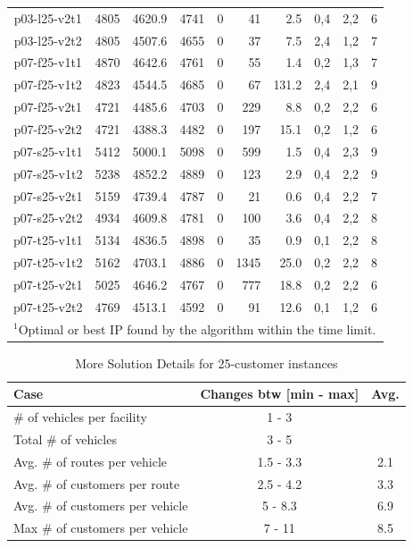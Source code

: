 \begin{table}[!htbp]
\begin {tabular}[!h]{|c|c|c|c|c|r|r|c|c|c|}
p03-l25-v2t1 &  4805 &  4620.9 & 4741   & 0 & 41    & 2.5   & 0,4   & 2,2   & 6 \\
p03-l25-v2t2 &  4805 &  4507.6 & 4655   & 0 & 37    & 7.5   & 2,4   & 1,2   & 7 \\\hline
p07-f25-v1t1 &  4870 &  4642.6 & 4761   & 0 & 55    & 1.4   & 0,2   & 1,3   & 7 \\
p07-f25-v1t2 &  4823 &  4544.5 & 4685   & 0 & 67    & 131.2 & 2,4   & 2,1   & 9 \\
p07-f25-v2t1 &  4721 &  4485.6 & 4703   & 0 & 229   & 8.8   & 0,2   & 2,2   & 6 \\
p07-f25-v2t2 &  4721 &  4388.3 & 4482   & 0 & 197   & 15.1  & 0,2   & 1,2   & 6 \\\hline
p07-s25-v1t1 &  5412 &  5000.1 & 5098   & 0 & 599   & 1.5   & 0,4   & 2,3   & 9 \\
p07-s25-v1t2 &  5238 &  4852.2 & 4889   & 0 & 123   & 2.9   & 0,4   & 2,2   & 9 \\
p07-s25-v2t1 &  5159 &  4739.4 & 4787   & 0 & 21    & 0.6   & 0,4   & 2,2   & 7 \\
p07-s25-v2t2 &  4934 &  4609.8 & 4781   & 0 & 100   & 3.6   & 0,4   & 2,2   & 8 \\\hline
p07-t25-v1t1 &  5134 &  4836.5 & 4898   & 0 & 35    & 0.9   & 0,1   & 2,2   & 8 \\
p07-t25-v1t2 &  5162 &  4703.1 & 4886   & 0 & 1345  & 25.0  & 0,2   & 2,2   & 8 \\
p07-t25-v2t1 &  5025 &  4646.2 & 4767   & 0 & 777   & 18.8  & 0,2   & 2,2   & 6 \\
p07-t25-v2t2 &  4769 &  4513.1 & 4592   & 0 & 91    & 12.6  & 0,1   & 1,2   & 6 \\\hline
\multicolumn{10}{l}{$^1$Optimal or best IP found by the algorithm within the time limit.}\\
\end{tabular}
\end{table}

\begin{table}[h!tbp]
\centering
\caption{More Solution Details for 25-customer instances}\label{SolDet}
\begin {tabular}[!h]{|l|c|c|} \hline
Case                          & Changes btw [min - max] & Avg.  \\\hline
\# of vehicles per facility      &  1 - 3 &  \mbox{}  \\
Total \# of vehicles             &  3 - 5  &  \mbox{}  \\
Avg. \# of routes per vehicle    &  1.5 - 3.3 & 2.1  \\
Avg. \# of customers per route   &  2.5 - 4.2 & 3.3  \\
Avg. \# of customers per vehicle &  5 - 8.3   & 6.9  \\
Max \# of customers per vehicle  &  7 - 11    & 8.5  \\\hline
\end{tabular}
\end{table}

